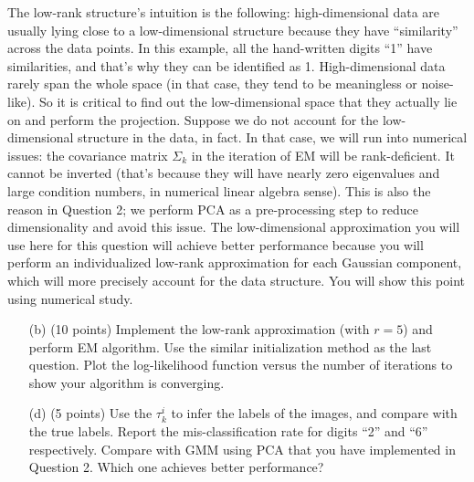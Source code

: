\documentclass[twoside,12pt]{article}
\begin{document}
The low-rank structure's intuition is the following: high-dimensional data are usually lying close to a low-dimensional structure because they have ``similarity'' across the data points. In this example, all the hand-written digits ``1'' have similarities, and that's why they can be identified as 1. High-dimensional data rarely span the whole space (in that case, they tend to be meaningless or noise-like). So it is critical to find out the low-dimensional space that they actually lie on and perform the projection. Suppose we do not account for the low-dimensional structure in the data, in fact. In that case, we will run into numerical issues: the covariance matrix $\Sigma_k$ in the iteration of EM will be rank-deficient. It cannot be inverted (that's because they will have nearly zero eigenvalues and large condition numbers, in numerical linear algebra sense). This is also the reason in Question 2; we perform PCA as a pre-processing step to reduce dimensionality and avoid this issue. The low-dimensional approximation you will use here for this question will achieve better performance because you will perform an individualized low-rank approximation for each Gaussian component, which will more precisely account for the data structure. You will show this point using numerical study. 

\begin{enumerate}


\item[(b)] (10 points) Implement the low-rank approximation (with $r = 5$) and perform EM algorithm. Use the similar initialization method as the last question. Plot the log-likelihood function versus the number of iterations to show your algorithm is converging.

\item[(d)] (5 points) Use the $\tau^i_k$ to infer the labels of the images, and compare with the true labels. Report the mis-classification rate for digits ``2'' and ``6'' respectively.  Compare with GMM using PCA that you have implemented in Question 2. Which one achieves better performance?

\end{enumerate}
\end{document}
